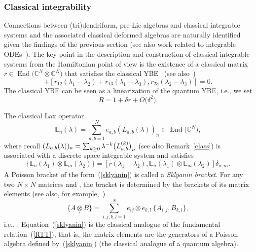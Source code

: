 \documentclass[10pt,a4paper]{amsart}
\numberwithin{equation}{section}
\theoremstyle{definition}
\DeclareMathOperator{\EEnd}{End}%
\def\mathcal#1{#1}%
\begin{document}
\subsubsection*{Classical integrability}
Connections between (tri)dendriform, pre-Lie algebras and classical integrable systems and the associated
classical deformed algebras are naturally identified given the findings of the previous section (see also work related to integrable ODEs~\cite{Gol}).
The key point in the description and construction of classical integrable systems from the Hamiltonian point of view is the existence of a classical matrix $r \in \EEnd\bigl({\mathbb C}^{\mathcal N} \otimes {\mathbb C}^{\mathcal N}\bigr)$ that satisfies the classical YBE~\cite{FT, TST} (see also~\cite{RotYB})
\begin{equation*}
[r_{12}(\lambda_1-\lambda_2), r_{13}(\lambda_1-\lambda_3)] + [r_{12}(\lambda_1-\lambda_2)+r_{13}(\lambda_1-\lambda_3), r_{23}(\lambda_2-\lambda_3)] =0.
\end{equation*}
The classical YBE can be seen as a linearization of the quantum YBE, i.e., we set
\[
R= 1 + \delta r + {\mathcal O}\bigl(\delta^2\bigr).
\]

The classical Lax operator
\[
{\mathbb L}_n(\lambda) = \sum_{a,b =1}^{\mathcal N} e_{a,b} (L_{a,b}(\lambda))_n\in \EEnd\bigl({\mathbb C}^{\mathcal N}\bigr),
\]
 where recall $(L_{a,b}(\lambda))_n = \smash{\sum_{k \geq 0} \lambda^{-k}\bigl(L^{(k)}_{a,b}\bigr)_n}$ (see also Remark~\ref{class}) is associated with a discrete space integrable system and satisfies~\cite{FT, Skl1, Skl2}
\begin{equation}
\{ {\mathbb L}_n(\lambda_1) \underset{,}{\otimes} {\mathbb L}_m(\lambda_2)\} = [r(\lambda_1-\lambda_2), { \mathbb L}_n(\lambda_1)\otimes {\mathbb L}_m(\lambda_2)]\delta_{n,m}. \label{sklyanin}
\end{equation}
A Poisson bracket of the form~(\ref{sklyanin}) is called a {\it Sklyanin bracket}. For any two ${\mathcal N}\times {\mathcal N}$ matrices \smash{$A =\sum_{i,j=1}^{\mathcal N} e_{i,j}A_{i,j}$} and \smash{$B = \sum_{i,j=1}^{\mathcal N}e_{i,j} B_{i,j}$}, the bracket  is determined by the brackets of its matrix elements (see also, for example,~\cite{Chari, FT})
\begin{equation}
\{A \underset{,}{\otimes} B\} = \sum_{i,j, k,l=1}^{\mathcal N} e_{ij}\otimes e_{k,l}\ \{A_{i,j}, B_{k,l}\}, \nonumber
\end{equation}
i.e., .
Equation~(\ref{sklyanin}) is the classical analogue of the fundamental relation~(\ref{RTT}),
that is, the matrix elements  are the generators of a Poisson algebra defined
by~(\ref{sklyanin}) (the classical analogue of a quantum algebra).
\end{document}
